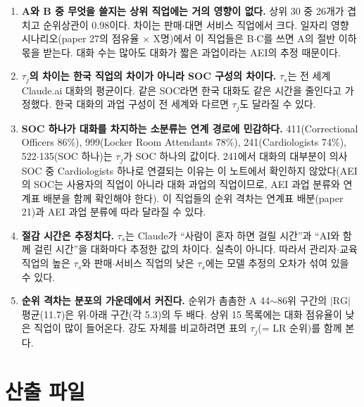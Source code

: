 \documentclass[11pt]{article}
\begin{document}
\begin{enumerate}[leftmargin=*]
  \item \textbf{A와 B 중 무엇을 쓸지는 상위 직업에는 거의 영향이 없다.} 상위 30 중 26개가 겹치고 순위상관이 0.98이다. 차이는 판매$\cdot$대면 서비스 직업에서 크다. 일자리 영향 시나리오(paper 27의 점유율 $\times$ X명)에서 이 직업들은 B$\cdot$C를 쓰면 A의 절반 이하 몫을 받는다. 대화 수는 많아도 대화가 짧은 과업이라는 AEI의 추정 때문이다.
  \item \textbf{$\tau_j$의 차이는 한국 직업의 차이가 아니라 SOC 구성의 차이다.} $\tau_s$는 전 세계 Claude.ai 대화의 평균이다. 같은 SOC라면 한국 대화도 같은 시간을 줄인다고 가정했다. 한국 대화의 과업 구성이 전 세계와 다르면 $\tau_j$도 달라질 수 있다.
  \item \textbf{SOC 하나가 대화를 차지하는 소분류는 연계 경로에 민감하다.} 411(Correctional Officers 86\%), 999(Locker Room Attendants 78\%), 241(Cardiologists 74\%), 522$\cdot$135(SOC 하나)는 $\tau_j$가 SOC 하나의 값이다. 241에서 대화의 대부분이 의사 SOC 중 Cardiologists 하나로 연결되는 이유는 이 노트에서 확인하지 않았다(AEI의 SOC는 사용자의 직업이 아니라 대화 과업의 직업이므로, AEI 과업 분류와 연계표 배분을 함께 확인해야 한다). 이 직업들의 순위 격차는 연계표 배분(paper 21)과 AEI 과업 분류에 따라 달라질 수 있다.
  \item \textbf{절감 시간은 추정치다.} $\tau_s$는 Claude가 ``사람이 혼자 하면 걸릴 시간''과 ``AI와 함께 걸린 시간''을 대화마다 추정한 값의 차이다\parencite{tamkin-2025-estimating-ai-productivity-gains-from}. 실측이 아니다. 따라서 관리자$\cdot$교육 직업의 높은 $\tau_s$와 판매$\cdot$서비스 직업의 낮은 $\tau_s$에는 모델 추정의 오차가 섞여 있을 수 있다.
  \item \textbf{순위 격차는 분포의 가운데에서 커진다.} 순위가 촘촘한 A 44$\sim$86위 구간의 $|\mathrm{RG}|$ 평균(11.7)은 위$\cdot$아래 구간(각 5.3)의 두 배다. 상위 15 목록에는 대화 점유율이 낮은 직업이 많이 들어온다. 강도 자체를 비교하려면 표의 $\tau_j$(= LR 순위)를 함께 본다.
\end{enumerate}

\section{산출 파일}
\end{document}
